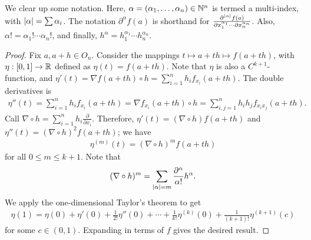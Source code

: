We clear up some notation. Here, $\alpha = (\alpha_{1},\ldots,\alpha_{n}) \in \mathbb{N}^{n}$ is termed a multi-index, with $\left| \alpha \right| = \sum \alpha_{i}$. The notation $\partial^{\alpha}f(a)$ is shorthand for $\frac{\partial^{\left| \alpha \right|}f(a)}{\partial x_{1}^{\alpha_{1}} \cdots \partial x_{n}^{\alpha_{n}}}$. Also, $\alpha! = \alpha_{1}! \cdots \alpha_{n}!$, and finally, $h^{\alpha} = h_{1}^{\alpha_{1}} \cdots h_{n}^{\alpha_{n}}$.

\begin{proof}
    Fix $a,a+h \in O_{n}$. Consider the mappings $t \mapsto a+th \mapsto f(a+th)$, with $\eta:[0,1] \to \mathbb{R}$ defined as $\eta(t) = f(a+th)$. Note that $\eta$ is also a $C^{k+1}$-function, and $\eta'(t) = \nabla f(a+th) \circ h = \sum_{i=1}^{n} h_{i}f_{x_{i}}(a+th)$. The double derivatives is
    \begin{align}
        \eta''(t) = \sum_{i=1}^{n} h_{i}f_{x_{i}}(a+th) = \nabla f_{x_{i}}(a+th) \circ h = \sum_{i,j=1}^{n} h_{i}h_{j}f_{x_{i}x_{j}}(a+th).
    \end{align}
    Call $\nabla \circ h = \sum_{i=1}^{n} h_{i} \frac{\partial}{\partial x_{i}}$. Therefore, $\eta'(t) = (\nabla \circ h) f(a+th)$ and $\eta''(t) = (\nabla \circ h)^{2}f(a+th)$; we have
    \begin{align}
        \eta^{(m)}(t) = (\nabla \circ h)^{m}f(a+th)
    \end{align}
    for all $0 \leq m \leq k+1$. Note that 
    \begin{align}
        (\nabla \circ h)^{m} = \sum_{\left| \alpha \right|=m} \frac{\partial^{\alpha}}{\alpha!}h^{\alpha}.
    \end{align}
    We apply the one-dimensional Taylor's theorem to get
    \begin{align}
        \eta(1) = \eta(0) + \eta'(0) + \frac{1}{2!}\eta''(0) + \cdots + \frac{1}{k!}\eta^{(k)}(0) + \frac{1}{(k+1)!} \eta^{(k+1)} (c)
    \end{align}
    for some $c \in (0,1)$. Expanding in terms of $f$ gives the desired result.
\end{proof}